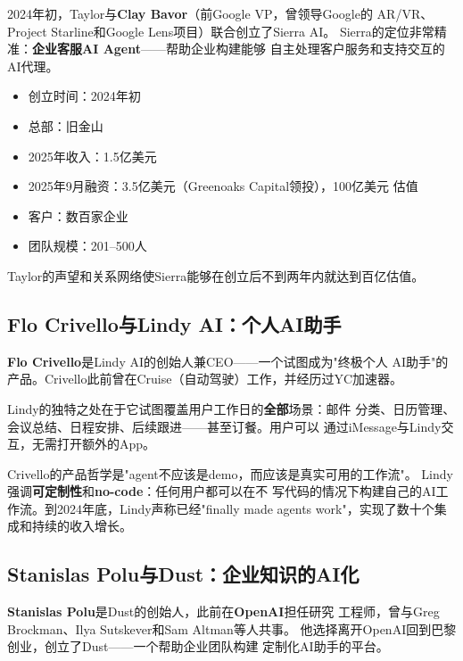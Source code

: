 2024年初，Taylor与\textbf{Clay Bavor}（前Google VP，曾领导Google的
AR/VR、Project Starline和Google Lens项目）联合创立了Sierra AI。
Sierra的定位非常精准：\textbf{企业客服AI Agent}——帮助企业构建能够
自主处理客户服务和支持交互的AI代理。

\begin{corebox}
\begin{itemize}
  \item 创立时间：2024年初
  \item 总部：旧金山
  \item 2025年收入：1.5亿美元
  \item 2025年9月融资：3.5亿美元（Greenoaks Capital领投），100亿美元
    估值
  \item 客户：数百家企业
  \item 团队规模：201--500人
\end{itemize}
Taylor的声望和关系网络使Sierra能够在创立后不到两年内就达到百亿估值。
\end{corebox}

\subsection{Flo Crivello与Lindy AI：个人AI助手}
\label{subsec:founders-lindy}

\textbf{Flo Crivello}是Lindy AI的创始人兼CEO——一个试图成为"终极个人
AI助手"的产品。Crivello此前曾在Cruise（自动驾驶）工作，并经历过YC加速器。

Lindy的独特之处在于它试图覆盖用户工作日的\textbf{全部}场景：邮件
分类、日历管理、会议总结、日程安排、后续跟进——甚至订餐。用户可以
通过iMessage与Lindy交互，无需打开额外的App。

Crivello的产品哲学是"agent不应该是demo，而应该是真实可用的工作流"。
Lindy强调\textbf{可定制性}和\textbf{no-code}：任何用户都可以在不
写代码的情况下构建自己的AI工作流。到2024年底，Lindy声称已经"finally
made agents work"，实现了数十个集成和持续的收入增长。

\subsection{Stanislas Polu与Dust：企业知识的AI化}
\label{subsec:founders-dust}

\textbf{Stanislas Polu}是Dust的创始人，此前在\textbf{OpenAI}担任研究
工程师，曾与Greg Brockman、Ilya Sutskever和Sam Altman等人共事。
他选择离开OpenAI回到巴黎创业，创立了Dust——一个帮助企业团队构建
定制化AI助手的平台。

